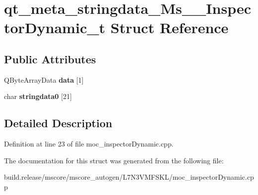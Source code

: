 \hypertarget{structqt__meta__stringdata___ms_____inspector_dynamic__t}{}\section{qt\+\_\+meta\+\_\+stringdata\+\_\+\+Ms\+\_\+\+\_\+\+Inspector\+Dynamic\+\_\+t Struct Reference}
\label{structqt__meta__stringdata___ms_____inspector_dynamic__t}
\subsection*{Public Attributes}
\begin{DoxyCompactItemize}
\item 
\mbox{\label{structqt__meta__stringdata___ms_____inspector_dynamic__t_ada3fdb02b765e1e796570c5b22977b68}} 
Q\+Byte\+Array\+Data {\bfseries data} \mbox{[}1\mbox{]}
\item 
\mbox{\label{structqt__meta__stringdata___ms_____inspector_dynamic__t_ae363a050b2ae8bc560635795f3de7864}} 
char {\bfseries stringdata0} \mbox{[}21\mbox{]}
\end{DoxyCompactItemize}


\subsection{Detailed Description}


Definition at line 23 of file moc\+\_\+inspector\+Dynamic.\+cpp.



The documentation for this struct was generated from the following file\+:\begin{DoxyCompactItemize}
\item 
build.\+release/mscore/mscore\+\_\+autogen/\+L7\+N3\+V\+M\+F\+S\+K\+L/moc\+\_\+inspector\+Dynamic.\+cpp\end{DoxyCompactItemize}
